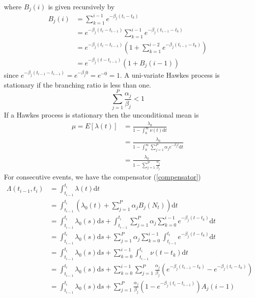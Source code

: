 \documentclass{amsart}
\newcommand{\mathd}{\mathrm{d}}
\begin{document}
where $B_j ( i)$ is given recursively by
\begin{equation}
  \begin{array}{ll}
    B_j ( i) & = \sum_{k = 1}^{i - 1} e^{- \beta_j ( t_i - t_k)}\\
    & = e^{- \beta_j ( t_i - t_{i - 1})}_{} \sum_{k = 1}^{i - 1} e^{- \beta_j
    ( t_{i - 1} - t_k)}\\
    & = e^{- \beta_j ( t_i - t_{i - 1})}_{}  \left( 1 + \sum_{k = 1}^{i - 2}
    e^{- \beta_j ( t_{i - 1} - t_k)} \right)\\
    & = e^{- \beta_j ( t - t_{i - 1})} ( 1 + B_j ( i - 1))
  \end{array} \label{Bj}
\end{equation}
since $e^{- \beta_j ( t_{i - 1} - t_{i - 1})} = e^{- \beta_j 0} = e^{- 0} =
1$. A uni-variate Hawkes process is stationary if the branching ratio is less
than one.
\begin{equation}
  \sum_{j = 1}^P \frac{\alpha_j}{\beta_j} < 1 \label{hs}
\end{equation}
If a Hawkes process is stationary then the unconditional mean is
\begin{equation}
  \begin{array}{ll}
    \mu = E [ \lambda ( t)] & = \frac{\lambda_0}{1 - \int_0^{\infty} \nu ( t)
    \mathd t}\\
    & = \frac{\lambda_0}{1 - \int_0^{\infty} \sum_{j = 1}^P \alpha_j e^{-
    \beta_j t} \mathd t}\\
    & = \frac{\lambda_0}{1 - \sum_{j = 1}^P \frac{\alpha_j}{\beta_j}}
  \end{array} \label{hm}
\end{equation}
For consecutive events, we have the compensator (\ref{compensator})
\begin{equation}
  \begin{array}{ll}
    \Lambda ( t_{i - 1}, t_i) & = \int_{t_{i - 1}}^{t_i} \lambda ( t) \mathd
    t\\
    & = \int_{t_{i - 1}}^{t_i} \left( \lambda_0 ( t) + \sum_{j = 1}^P
    \alpha_j B_j ( N_t) \right) \mathd t\\
    & = \int_{t_{i - 1}^{}}^{t_i} \lambda_0 ( s) \mathd s + \int_{t_{i -
    1}^{}}^{t_i} \sum_{j = 1}^P \alpha_j \sum_{k = 0}^{i - 1} e^{- \beta_j ( t
    - t_k)} \mathd t\\
    & = \int_{t_{i - 1}^{}}^{t_i} \lambda_0 ( s) \mathd s + \sum_{j = 1}^P
    \alpha_j \sum_{k = 0}^{i - 1}  \int_{t_{i - 1}^{}}^{t_i} e^{- \beta_j ( t
    - t_k)} \mathd t\\
    & = \int_{t_{i - 1}^{}}^{t_i} \lambda_0 ( s) \mathd s + \sum_{k = 0}^{i -
    1} \int_{t_{i - 1}}^{t_i} \nu ( t - t_k) \mathd t\\
    & = \int_{t_{i - 1}^{}}^{t_i} \lambda_0 ( s) \mathd s + \sum_{k = 0}^{i -
    1} \sum_{j = 1}^P \frac{\alpha_j}{\beta_j} ( e^{- \beta_j ( t_{i - 1} -
    t_k)} - e^{- \beta_j ( t_i - t_k)})\\
    & = \int_{t_{i - 1}^{}}^{t_i} \lambda_0 ( s) \mathd s + \sum_{j = 1}^P
    \frac{\alpha_j}{\beta_j} ( 1 - e^{- \beta_j ( t_i - t_{i - 1})}) A_j ( i -
    1)
  \end{array} \label{hc}
\end{equation}
\end{document}
